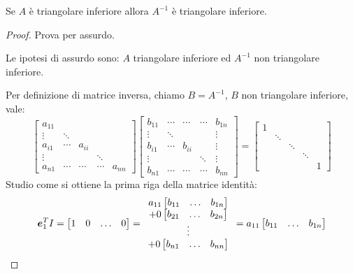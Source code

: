 \begin{exercise}[3.4]
\label{exercise:341}
Se $A$ \`e triangolare inferiore allora $A^{-1}$ \`e triangolare inferiore.
\end{exercise}
\begin{proof}
Prova per assurdo.

Le ipotesi di assurdo sono: $A$ triangolare inferiore ed $A^{-1}$ non
triangolare inferiore. 

Per definizione di matrice inversa, chiamo $B = A^{-1}$, $B$ non triangolare
inferiore, vale:
\begin{displaymath}
\begin{bmatrix}
a_{11} \\
\vdots & \ddots \\
a_{i1} & \cdots & a_{ii} \\
\vdots & 		&		& \ddots\\
a_{n1} & \cdots & \cdots &\cdots & a_{nn}
\end{bmatrix} %
\begin{bmatrix}
b_{11} & \cdots & \cdots &\cdots & b_{1n} \\
\vdots & \ddots &		&		& \vdots\\
b_{i1} & \cdots & b_{ii} &		& \vdots\\
\vdots & 		&		& \ddots & \vdots\\
b_{n1} & \cdots & \cdots &\cdots & b_{nn}
\end{bmatrix} =
\begin{bmatrix}
1 \\
 & \ddots \\
 & 		& \ddots \\
 & 		&		& \ddots\\
 &  	&  		&		& 1
\end{bmatrix}
\end{displaymath}
Studio come si ottiene la prima riga della matrice identit\`a:
\begin{displaymath}
\boldsymbol{e}_{1}^{T} I = 
\begin{bmatrix}
1 & 0 & \ldots & 0
\end{bmatrix} = 
\begin{array}{c}
a_{11}
	\begin{bmatrix}
	b_{11} & \ldots & b_{1n}
	\end{bmatrix} \\
+ 0
	\begin{bmatrix}
	b_{21} & \ldots & b_{2n}
	\end{bmatrix}  \\
\vdots \\
+ 0
	\begin{bmatrix}
	b_{n1} & \ldots & b_{nn}
	\end{bmatrix}
\end{array} =
a_{11}
	\begin{bmatrix}
	b_{11} & \ldots & b_{1n}
	\end{bmatrix} 
\end{displaymath}


\end{proof}
